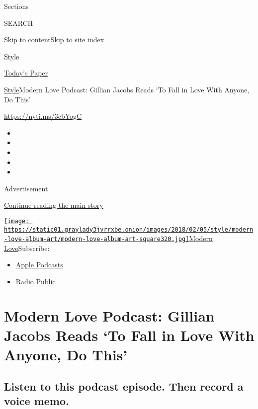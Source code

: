 Sections

SEARCH

\protect\hyperlink{site-content}{Skip to
content}\protect\hyperlink{site-index}{Skip to site index}

\href{https://www.nytimes3xbfgragh.onion/section/style}{Style}

\href{https://myaccount.nytimes3xbfgragh.onion/auth/login?response_type=cookie\&client_id=vi}{}

\href{https://www.nytimes3xbfgragh.onion/section/todayspaper}{Today's
Paper}

\href{/section/style}{Style}\textbar{}Modern Love Podcast: Gillian
Jacobs Reads `To Fall in Love With Anyone, Do This'

\url{https://nyti.ms/3cbYogC}

\begin{itemize}
\item
\item
\item
\item
\item
\end{itemize}

Advertisement

\protect\hyperlink{after-top}{Continue reading the main story}

\href{https://www.nytimes3xbfgragh.onion/column/modern-love-podcast}{\texttt{[image: https://static01.graylady3jvrrxbe.onion/images/2018/02/05/style/modern-love-album-art/modern-love-album-art-square320.jpg]}Modern
Love}Subscribe:

\begin{itemize}
\tightlist
\item
  \href{https://itunes.apple.com/us/podcast/id1065559535}{Apple
  Podcasts}
\item
  \href{https://play.radiopublic.com/modern-love-k6pYB8}{Radio Public}
\end{itemize}

\hypertarget{modern-love-podcast-gillian-jacobs-reads-to-fall-in-love-with-anyone-do-this}{%
\section{Modern Love Podcast: Gillian Jacobs Reads `To Fall in Love With
Anyone, Do
This'}\label{modern-love-podcast-gillian-jacobs-reads-to-fall-in-love-with-anyone-do-this}}

\hypertarget{listen-to-this-podcast-episode-then-record-a-voice-memo}{%
\subsection{Listen to this podcast episode. Then record a voice
memo.}\label{listen-to-this-podcast-episode-then-record-a-voice-memo}}

